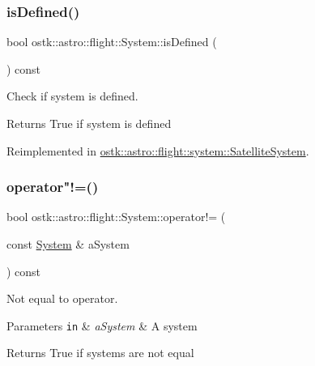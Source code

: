 \subsubsection{\texorpdfstring{is\+Defined()}{isDefined()}}
{\footnotesize\ttfamily bool ostk\+::astro\+::flight\+::\+System\+::is\+Defined (\begin{DoxyParamCaption}{ }\end{DoxyParamCaption}) const\hspace{0.3cm}{\ttfamily [virtual]}}



Check if system is defined. 

\begin{DoxyReturn}{Returns}
True if system is defined 
\end{DoxyReturn}


Reimplemented in \hyperlink{classostk_1_1astro_1_1flight_1_1system_1_1_satellite_system_a6d10fc37776cc87a74fe8b7e2ccb9843}{ostk\+::astro\+::flight\+::system\+::\+Satellite\+System}.

\mbox{\label{classostk_1_1astro_1_1flight_1_1_system_a5426b85c139cf30be998e0a983fe5978}} 
\subsubsection{\texorpdfstring{operator"!=()}{operator!=()}}
{\footnotesize\ttfamily bool ostk\+::astro\+::flight\+::\+System\+::operator!= (\begin{DoxyParamCaption}\item[{const \hyperlink{classostk_1_1astro_1_1flight_1_1_system}{System} \&}]{a\+System }\end{DoxyParamCaption}) const}



Not equal to operator. 


\begin{DoxyParams}[1]{Parameters}
\mbox{\tt in}  & {\em a\+System} & A system \\
\hline
\end{DoxyParams}
\begin{DoxyReturn}{Returns}
True if systems are not equal 
\end{DoxyReturn}
\mbox{\label{classostk_1_1astro_1_1flight_1_1_system_a8d8602da9451044f9810eaf22076b852}} 
